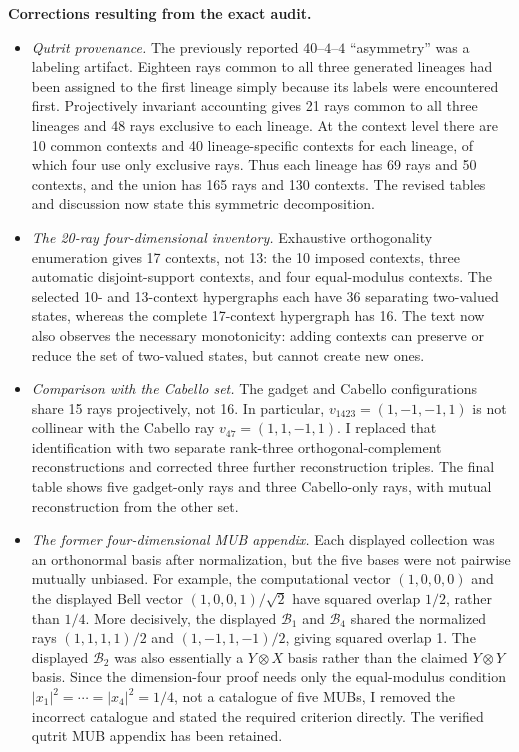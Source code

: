 \documentclass[11pt]{article}
\begin{document}
\textbf{Corrections resulting from the exact audit.}
\begin{itemize}
\item \emph{Qutrit provenance.}  The previously reported $40$--$4$--$4$ ``asymmetry'' was a labeling artifact.  Eighteen rays common to all three generated lineages had been assigned to the first lineage simply because its labels were encountered first.  Projectively invariant accounting gives 21 rays common to all three lineages and 48 rays exclusive to each lineage.  At the context level there are 10 common contexts and 40 lineage-specific contexts for each lineage, of which four use only exclusive rays.  Thus each lineage has 69 rays and 50 contexts, and the union has 165 rays and 130 contexts.  The revised tables and discussion now state this symmetric decomposition.

\item \emph{The 20-ray four-dimensional inventory.}  Exhaustive orthogonality enumeration gives 17 contexts, not 13: the 10 imposed contexts, three automatic disjoint-support contexts, and four equal-modulus contexts.  The selected 10- and 13-context hypergraphs each have 36 separating two-valued states, whereas the complete 17-context hypergraph has 16.  The text now also observes the necessary monotonicity: adding contexts can preserve or reduce the set of two-valued states, but cannot create new ones.

\item \emph{Comparison with the Cabello set.}  The gadget and Cabello configurations share 15 rays projectively, not 16.  In particular, $v_{1423}=(1,-1,-1,1)$ is not collinear with the Cabello ray $v_{47}=(1,1,-1,1)$.  I replaced that identification with two separate rank-three orthogonal-complement reconstructions and corrected three further reconstruction triples.  The final table shows five gadget-only rays and three Cabello-only rays, with mutual reconstruction from the other set.

\item \emph{The former four-dimensional MUB appendix.}  Each displayed collection was an orthonormal basis after normalization, but the five bases were not pairwise mutually unbiased.  For example, the computational vector $(1,0,0,0)$ and the displayed Bell vector $(1,0,0,1)/\sqrt{2}$ have squared overlap $1/2$, rather than $1/4$.  More decisively, the displayed $\mathcal B_1$ and $\mathcal B_4$ shared the normalized rays $(1,1,1,1)/2$ and $(1,-1,1,-1)/2$, giving squared overlap 1.  The displayed $\mathcal B_2$ was also essentially a $Y\otimes X$ basis rather than the claimed $Y\otimes Y$ basis.  Since the dimension-four proof needs only the equal-modulus condition $|x_1|^2=\cdots=|x_4|^2=1/4$, not a catalogue of five MUBs, I removed the incorrect catalogue and stated the required criterion directly.  The verified qutrit MUB appendix has been retained.
\end{itemize}
\end{document}
